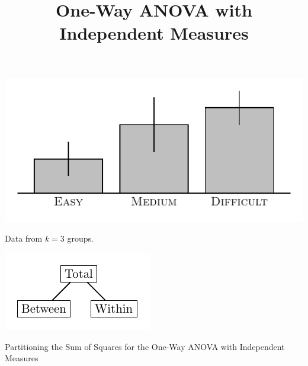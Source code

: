 \documentclass{tufte-handout}
\title{One-Way ANOVA with Independent Measures}
\date{} %
\begin{document}
\maketitle%




\begin{marginfigure}[20pt]
  \includegraphics[width=\linewidth]{images/anova_data_one-way}%
  \label{fig:fullfig}%
  \caption{Data from $k=3$ groups.}
\end{marginfigure}

\begin{marginfigure}[10pt]
  \includegraphics[width=\linewidth]{images/anova_partition_one_way_indep}%
  \label{fig:fullfig}%
  \caption{Partitioning the Sum of Squares for the One-Way ANOVA with Independent Measures}
\end{marginfigure}
\end{document}
